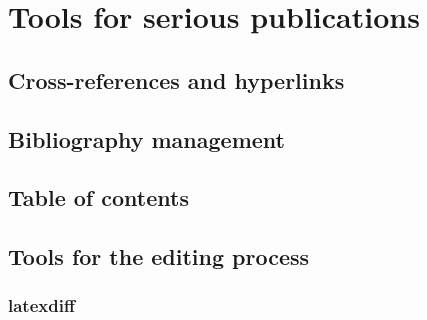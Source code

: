 \chapter{Tools for serious publications}

\section{Cross-references and hyperlinks}\label{sec:crossref}

\section{Bibliography management}\label{sec:bibliography}



\section{Table of contents}


\section{Tools for the editing process}


\subsection{latexdiff}
